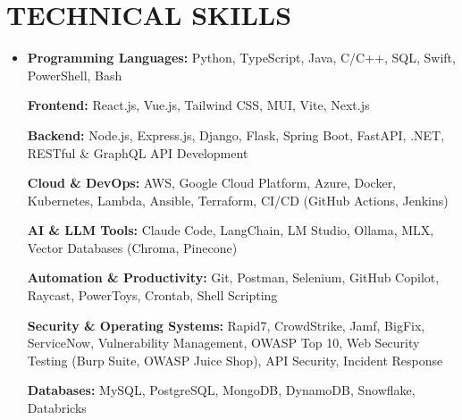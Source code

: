 \documentclass[letterpaper,10pt]{article}
\newcommand{\resumeSubHeadingListStart}{\begin{itemize}[leftmargin=0in,label={}]}
\newcommand{\resumeSubHeadingListEnd}{\end{itemize}}
\begin{document}
\section{TECHNICAL SKILLS}
\vspace{6pt}
\resumeSubHeadingListStart
\item \small{

\textbf{Programming Languages:} Python, TypeScript, Java, C/C++, SQL, Swift, PowerShell, Bash

\vspace{3pt}

\textbf{Frontend:} React.js, Vue.js, Tailwind CSS, MUI, Vite, Next.js

\vspace{3pt}

\textbf{Backend:} Node.js, Express.js, Django, Flask, Spring Boot, FastAPI, .NET, RESTful \& GraphQL API Development

\vspace{3pt}

\textbf{Cloud \& DevOps:} AWS, Google Cloud Platform, Azure, Docker, Kubernetes, Lambda, Ansible, Terraform, CI/CD (GitHub Actions, Jenkins)

\vspace{3pt}

\textbf{AI \& LLM Tools:} Claude Code, LangChain, LM Studio, Ollama, MLX, Vector Databases (Chroma, Pinecone)

\vspace{3pt}

\textbf{Automation \& Productivity:} Git, Postman, Selenium, GitHub Copilot, Raycast, PowerToys, Crontab, Shell Scripting

\vspace{3pt}

\textbf{Security \& Operating Systems:} Rapid7, CrowdStrike, Jamf, BigFix, ServiceNow, Vulnerability Management, OWASP Top 10, Web Security Testing (Burp Suite, OWASP Juice Shop), API Security, Incident Response

\vspace{3pt}

\textbf{Databases:} MySQL, PostgreSQL, MongoDB, DynamoDB, Snowflake, Databricks

}
\resumeSubHeadingListEnd
\end{document}
